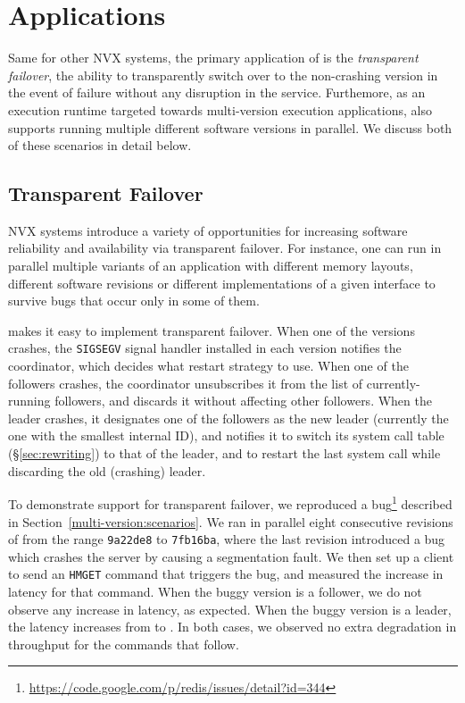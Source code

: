\section{Applications}
\label{sec:applications}

Same for other NVX systems, the primary application of \varan is the
\emph{transparent failover}, \ie the ability to transparently switch over to
the non-crashing version in the event of failure without any disruption in the
service. Furthemore, as an execution runtime targeted towards multi-version
execution applications, \varan also supports running multiple different
software versions in parallel.  We discuss both of these scenarios in detail
below.

\subsection{Transparent Failover}
\label{sec:failover}

NVX systems introduce a variety of opportunities for increasing
software reliability and availability via transparent failover.  For
instance, one can run in parallel multiple variants of an application with
different memory layouts, different software revisions or different
implementations of a given interface to survive bugs that occur 
only in some of them.   

\varan makes it easy to implement transparent failover.  When one of the
versions crashes, the \lstinline`SIGSEGV` signal handler installed in each
version notifies the coordinator, which decides what restart strategy
to use.  When one of the followers crashes, the coordinator unsubscribes it
from the list of currently-running followers, and discards it without
affecting other followers.  When the leader crashes, it designates one
of the followers as the new leader (currently the one with the
smallest internal ID), and notifies it to switch its system call table
(\S\ref{sec:rewriting}) to that of the leader, and to restart the last
system call while discarding the old (crashing) leader.

To demonstrate support for transparent failover, we reproduced a
\redis
bug\footnote{\url{https://code.google.com/p/redis/issues/detail?id=344}}
described in Section~\ref{multi-version:scenarios}.  We ran in
parallel eight consecutive revisions of \redis from the range
\lstinline`9a22de8` to \lstinline`7fb16ba`, where the last revision
introduced a bug which crashes the server by causing a segmentation
fault. We then set up a client to send an \lstinline`HMGET` command
that triggers the bug, and measured the increase in latency for that
command.  When the buggy version is a follower, we do not observe any
increase in latency, as expected.  When the buggy version is a leader,
the latency increases from \redisnormallatency to
\redisfailoverlatency.  In both cases, we observed no extra
degradation in throughput for the commands that follow.

